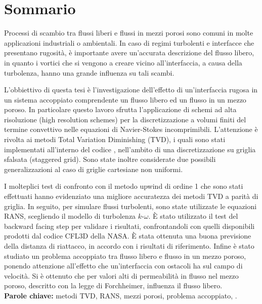 \chapter*{Sommario}
Processi di scambio tra flussi liberi e flussi in mezzi porosi sono comuni in 
molte applicazioni industriali o ambientali. In caso di regimi turbolenti e 
interfacce che presentano rugosità, è importante avere un'accurata 
descrizione del flusso libero, in quanto i vortici che si vengono a creare 
vicino all'interfaccia, a causa della turbolenza, hanno una grande influenza 
su tali scambi.

L'obbiettivo di questa tesi è l'investigazione dell'effetto di un'interfaccia 
rugosa in un sistema accoppiato comprendente un flusso libero ed un flusso in 
un mezzo poroso. In particolare questo lavoro sfrutta l'applicazione di schemi 
ad alta 
risoluzione (high resolution schemes) per la discretizzazione a volumi finiti 
del termine convettivo nelle equazioni di Navier-Stokes incomprimibili. L'attenzione è rivolta ai metodi Total Variation Diminishing (TVD), i quali sono stati implementati all'interno del codice \DUMUX, nell'ambito di una 
discretizzazione su griglia sfalsata (staggered grid). Sono state inoltre 
considerate due possibili generalizzazioni al caso di griglie cartesiane non 
uniformi.

I molteplici test di confronto con il metodo upwind di ordine 1 che sono stati 
effettuati hanno evidenziato una migliore accuratezza dei metodi TVD a parità 
di griglia. 
In seguito, per simulare flussi turbolenti, sono state utilizzate le equazioni 
RANS, scegliendo il modello di turbolenza $k\text{-}\omega$. È stato 
utilizzato il test del backward facing step per validare i risultati, 
confrontandoli con quelli disponibili prodotti dal codice CFL3D della NASA. È 
stata ottenuta una buona previsione della distanza di riattacco, in accordo con 
i risultati di riferimento. Infine è stato studiato un problema accoppiato tra 
flusso libero e flusso in un mezzo poroso, ponendo attenzione all'effetto che 
un'interfaccia con ostacoli ha sul campo di velocità. Si è ottenuto 
che per valori alti di permeabilità in flusso nel mezzo poroso, descritto con 
la legge di Forchheimer, influenza il flusso libero.
\\[\baselineskip]
\textbf{Parole chiave:} metodi TVD, RANS, mezzi porosi, problema accoppiato, 
\DUMUX.
